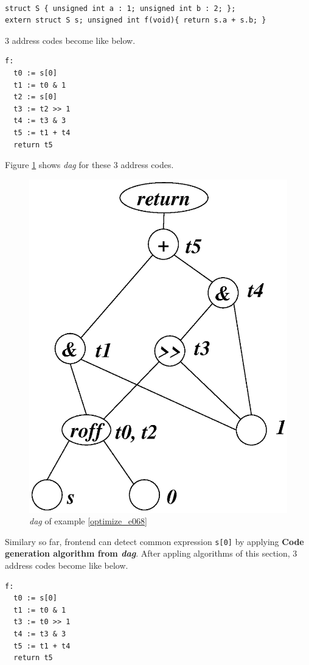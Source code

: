 \begin{Example}
\label{optimize_e068}
\begin{verbatim}

struct S { unsigned int a : 1; unsigned int b : 2; };
extern struct S s; unsigned int f(void){ return s.a + s.b; }
\end{verbatim}
3 address codes become like below.
\begin{verbatim}
f:
  t0 := s[0]
  t1 := t0 & 1
  t2 := s[0]
  t3 := t2 >> 1
  t4 := t3 & 3
  t5 := t1 + t4
  return t5
\end{verbatim}
Figure \ref{optimize_e069} shows {\em dag} for these 3 address codes.
\begin{figure}[htbp]
\begin{center}
\includegraphics[width=0.826\linewidth,height=1.0\linewidth]{opt028.eps}
\caption{{\em dag} of example \ref{optimize_e068}}
\label{optimize_e069}
\end{center}
\end{figure}
Similary so far, frontend can detect common expression {\tt{s[0]}}
by applying {\bf Code generation algorithm from {\em dag}}.
After appling algorithms of this section,
3 address codes become like below.
\begin{verbatim}
f:
  t0 := s[0]
  t1 := t0 & 1
  t3 := t0 >> 1
  t4 := t3 & 3
  t5 := t1 + t4
  return t5
\end{verbatim}
\end{Example}

